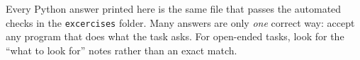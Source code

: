 \documentclass[level=1,teacher]{kidscode}
\begin{document}

\begin{teachernote}
Every Python answer printed here is the same file that passes the automated checks in the
\texttt{excercises} folder. Many answers are only \emph{one} correct way: accept any
program that does what the task asks. For open-ended tasks, look for the
\enquote{what to look for} notes rather than an exact match.
\end{teachernote}
\kcweeklytoc
{}
\end{document}
